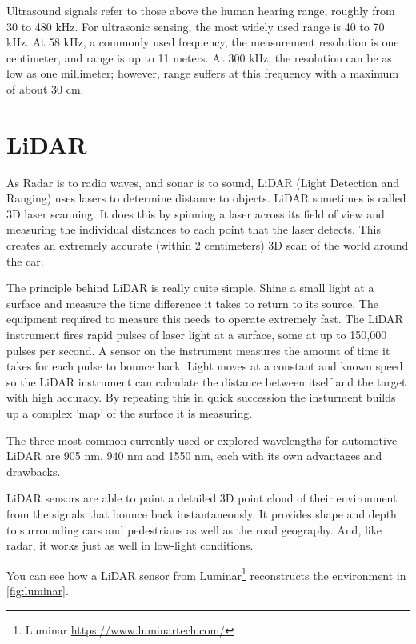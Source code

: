 Ultrasound signals refer to those above the human hearing range, roughly from 30
to 480 kHz. For ultrasonic sensing, the most widely used range is 40 to 70 kHz.
At 58 kHz, a commonly used frequency, the measurement resolution is one
centimeter, and range is up to 11 meters. At 300 kHz, the resolution can be as
low as one millimeter; however, range suffers at this frequency with a maximum
of about 30 cm.

\section{LiDAR}

As Radar is to radio waves, and sonar is to sound, LiDAR (Light Detection and
Ranging) uses lasers to determine distance to objects. LiDAR sometimes is called
3D laser scanning. It does this by spinning a laser across its field of view and
measuring the individual distances to each point that the laser detects. This
creates an extremely accurate (within 2 centimeters) 3D scan of the world around
the car.

The principle behind LiDAR is really quite simple. Shine a small light at a
surface and measure the time difference it takes to return to its source. The
equipment required to measure this needs to operate extremely fast. The LiDAR
instrument fires rapid pulses of laser light at a surface, some at up to 150,000
pulses per second. A sensor on the instrument measures the amount of time it
takes for each pulse to bounce back. Light moves at a constant and known speed
so the LiDAR instrument can calculate the distance between itself and the target
with high accuracy. By repeating this in quick succession the insturment builds
up a complex 'map' of the surface it is measuring.

The three most common currently used or explored wavelengths for automotive
LiDAR are 905 nm, 940 nm and 1550 nm, each with its own advantages and
drawbacks.

LiDAR sensors are able to paint a detailed 3D point cloud of their environment
from the signals that bounce back instantaneously. It provides shape and depth
to surrounding cars and pedestrians as well as the road geography. And, like
radar, it works just as well in low-light conditions.

You can see how a LiDAR sensor from Luminar\footnote{Luminar
    \url{https://www.luminartech.com/}} reconstructs the environment in
\autoref{fig:luminar}.

